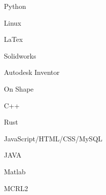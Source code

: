 \begin{cSubsection}{}
    \begin{experienceItem} {}{Python}{}{} \end{experienceItem}
    \begin{experienceItem} {\hphantom{}}{Linux}{}{} \end{experienceItem}
    \begin{experienceItem} {\hphantom{}}{LaTex}{}{} \end{experienceItem}
    \begin{experienceItem} {\hphantom{}}{Solidworks}{}{} \end{experienceItem}
    \begin{experienceItem} {\hphantom{}}{Autodesk Inventor}{}{} \end{experienceItem}
    \begin{experienceItem} {\hphantom{}}{On Shape}{}{} \end{experienceItem}

    \begin{experienceItem} {}{C++}{}{} \end{experienceItem}
    \begin{experienceItem} {\hphantom{}}{Rust}{}{} \end{experienceItem}
    \begin{experienceItem} {\hphantom{}}{JavaScript/HTML/CSS/MySQL}{}{} \end{experienceItem}
    \begin{experienceItem} {\hphantom{}}{JAVA}{}{} \end{experienceItem}
    \begin{experienceItem} {\hphantom{}}{Matlab}{}{} \end{experienceItem}
    \begin{experienceItem} {\hphantom{}}{MCRL2}{}{} \end{experienceItem}
\end{cSubsection}
